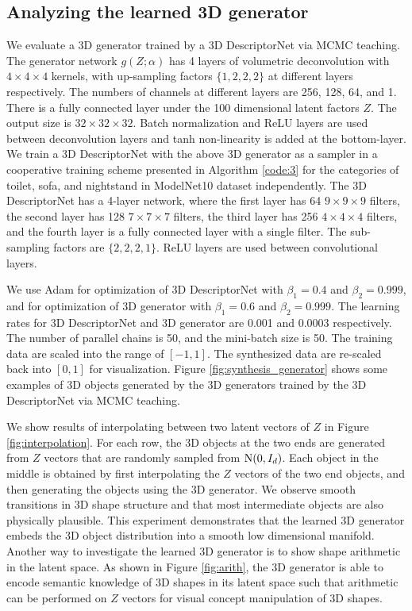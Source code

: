 \documentclass[10pt,twocolumn,letterpaper]{article}
\begin{document}
\subsection{Analyzing the learned 3D generator}

We evaluate a 3D generator trained by a 3D DescriptorNet via MCMC teaching. The generator network $g(Z; \alpha)$ has 4 layers of volumetric deconvolution with $4 \times 4 \times 4$ kernels, with up-sampling factors $\{1, 2, 2, 2\}$ at different layers respectively. The numbers of channels at different layers are 256, 128, 64, and 1. There is a fully connected layer under the 100 dimensional latent factors $Z$. The output size is $32 \times 32 \times 32$. Batch normalization and ReLU layers are used between deconvolution layers and tanh non-linearity is added at the bottom-layer. We train a 3D DescriptorNet with the above 3D generator as a sampler in a cooperative training scheme presented in Algorithm \ref{code:3} for the categories of toilet, sofa, and nightstand in ModelNet10 dataset independently. The 3D DescriptorNet has a 4-layer network, where the first layer has 64 $9 \times 9 \times 9$ filters, the second layer has 128 $7 \times 7 \times 7$ filters, the third layer has 256 $4 \times 4 \times 4$ filters, and the fourth layer is a fully connected layer with a single filter. The sub-sampling factors are $\{2, 2, 2, 1\}$. ReLU layers are used between convolutional layers. 
 
We use Adam for optimization of 3D DescriptorNet with $\beta_1=0.4$ and $ \beta_2=0.999$, and for optimization of 3D generator with $\beta_1=0.6$ and $\beta_2=0.999$. The learning rates for 3D DescriptorNet and 3D generator are 0.001 and 0.0003 respectively. The number of parallel chains is 50, and the mini-batch size is 50. The training data are scaled into the range of $[-1, 1]$. The synthesized data are re-scaled back into $[0, 1]$ for visualization. Figure \ref{fig:synthesis_generator} shows some examples of 3D objects generated by the 3D generators trained by the 3D DescriptorNet via MCMC teaching. 
 
We show results of interpolating between two latent vectors of $Z$ in Figure \ref{fig:interpolation}. For each row, the 3D objects at the two ends are generated from $Z$ vectors that are randomly sampled from ${\rm N}(0,I_d)$. Each object in the middle is obtained by first interpolating the $Z$ vectors of the two end objects, and then generating the objects using the 3D generator. We observe smooth transitions in 3D shape structure and that most intermediate objects are also physically plausible.
This experiment demonstrates that the learned 3D generator embeds the 3D object distribution into a smooth low dimensional manifold. Another way to investigate the learned 3D generator is to show shape arithmetic in the latent space. As shown in Figure \ref{fig:arith}, the 3D generator is able to encode semantic knowledge of 3D shapes in its latent space such that arithmetic can be performed on $Z$ vectors for visual concept manipulation of 3D shapes. 
\end{document}
